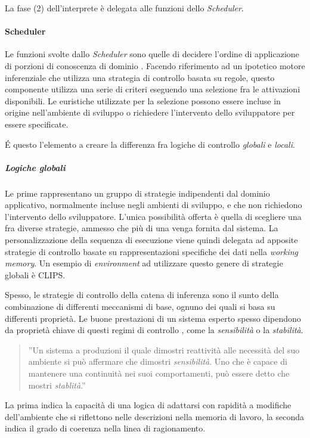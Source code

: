 La fase (2) dell'interprete è delegata alle funzioni dello \emph{Scheduler}. 

\paragraph{Scheduler} Le funzioni svolte dallo \emph{Scheduler} sono quelle di decidere l'ordine di applicazione di porzioni di conoscenza di dominio \cite{development1993}. Facendo riferimento ad un ipotetico motore inferenziale che utilizza una strategia di controllo basata su regole, questo componente utilizza una serie di criteri eseguendo una selezione fra le attivazioni disponibili. Le euristiche utilizzate per la selezione possono essere incluse in origine nell'ambiente di sviluppo o richiedere l'intervento dello sviluppatore per essere specificate.

\'E questo l'elemento a creare la differenza fra logiche di controllo \emph{globali} e \emph{locali}. 

\subparagraph{Logiche globali} Le prime rappresentano un gruppo di strategie indipendenti dal dominio applicativo, normalmente incluse negli ambienti di sviluppo, e che non richiedono l'intervento dello sviluppatore. L'unica possibilità offerta è quella di scegliere una fra diverse strategie, ammesso che più di una venga fornita dal sistema. La personalizzazione della sequenza di esecuzione viene quindi delegata ad apposite strategie di controllo basate su rappresentazioni specifiche dei dati nella \emph{working memory}. Un esempio di \emph{environment} ad utilizzare questo genere di strategie globali è CLIPS.

Spesso, le strategie di controllo della catena di inferenza sono il sunto della combinazione di differenti meccanismi di base, ognuno dei quali si basa su differenti proprietà. Le buone prestazioni di un sistema esperto spesso dipendono da proprietà chiave di questi regimi di controllo \cite{jackson1999}, come la \emph{sensibilità} o la \emph{stabilità}.
\begin{quote}
	''Un sistema a produzioni il quale dimostri reattività alle necessità del suo ambiente si può affermare che dimostri \emph{sensibilità}. Uno che è capace di mantenere una continuità nei suoi comportamenti, può essere detto che mostri \emph{stablità}.''\cite{McDermott:1977:PSC:1045343.1045364}
\end{quote} 
La prima indica la capacità di una logica di adattarsi con rapidità a modifiche dell'ambiente che si riflettono nelle descrizioni nella memoria di lavoro, la seconda indica il grado di coerenza nella linea di ragionamento.\cite{jackson1999}

